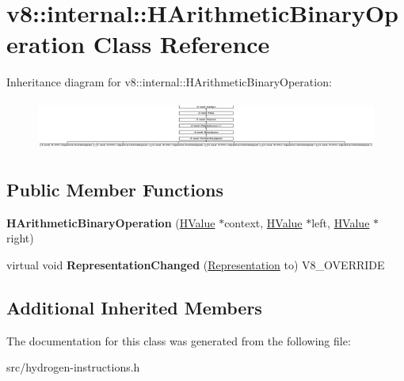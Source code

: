 \hypertarget{classv8_1_1internal_1_1_h_arithmetic_binary_operation}{}\section{v8\+:\+:internal\+:\+:H\+Arithmetic\+Binary\+Operation Class Reference}
\label{classv8_1_1internal_1_1_h_arithmetic_binary_operation}
Inheritance diagram for v8\+:\+:internal\+:\+:H\+Arithmetic\+Binary\+Operation\+:\begin{figure}[H]
\begin{center}
\leavevmode
\includegraphics[height=1.666667cm]{classv8_1_1internal_1_1_h_arithmetic_binary_operation}
\end{center}
\end{figure}
\subsection*{Public Member Functions}
\begin{DoxyCompactItemize}
\item 
\hypertarget{classv8_1_1internal_1_1_h_arithmetic_binary_operation_aa3b1ff5f8f327f2ad8c5ad744b30978a}{}{\bfseries H\+Arithmetic\+Binary\+Operation} (\hyperlink{classv8_1_1internal_1_1_h_value}{H\+Value} $\ast$context, \hyperlink{classv8_1_1internal_1_1_h_value}{H\+Value} $\ast$left, \hyperlink{classv8_1_1internal_1_1_h_value}{H\+Value} $\ast$right)\label{classv8_1_1internal_1_1_h_arithmetic_binary_operation_aa3b1ff5f8f327f2ad8c5ad744b30978a}

\item 
\hypertarget{classv8_1_1internal_1_1_h_arithmetic_binary_operation_af5fdf4b64a444da54de9d32c3baecd1e}{}virtual void {\bfseries Representation\+Changed} (\hyperlink{classv8_1_1internal_1_1_representation}{Representation} to) V8\+\_\+\+O\+V\+E\+R\+R\+I\+D\+E\label{classv8_1_1internal_1_1_h_arithmetic_binary_operation_af5fdf4b64a444da54de9d32c3baecd1e}

\end{DoxyCompactItemize}
\subsection*{Additional Inherited Members}


The documentation for this class was generated from the following file\+:\begin{DoxyCompactItemize}
\item 
src/hydrogen-\/instructions.\+h\end{DoxyCompactItemize}
